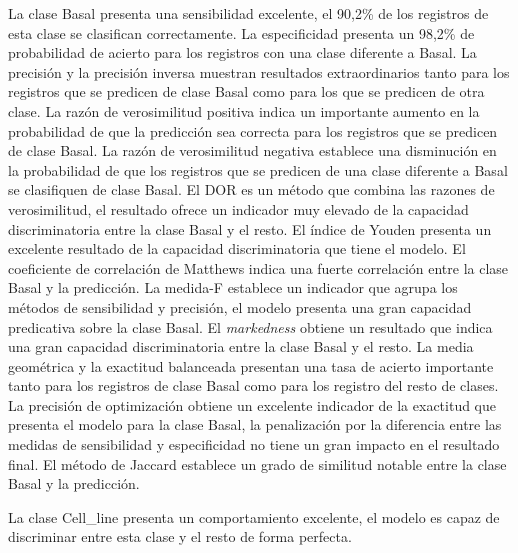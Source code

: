 La clase Basal presenta una sensibilidad excelente, el 90,2\% de los registros de esta clase se clasifican correctamente. La especificidad presenta un 98,2\% de probabilidad de acierto para los registros con una clase diferente a Basal. La precisión y la precisión inversa muestran resultados extraordinarios tanto para los registros que se predicen de clase Basal como para los que se predicen de otra clase. La razón de verosimilitud positiva indica un importante aumento en la probabilidad de que la predicción sea correcta para los registros  que se predicen de clase Basal. La razón de verosimilitud negativa establece una disminución en la probabilidad de que los registros que se predicen de una clase diferente a Basal se clasifiquen de clase Basal. El DOR es un método que combina las razones de verosimilitud, el resultado ofrece un indicador muy elevado de la capacidad discriminatoria entre la clase Basal y el resto. El índice de Youden presenta un excelente resultado de la capacidad discriminatoria que tiene el modelo. El coeficiente de correlación de Matthews indica una fuerte correlación entre la clase Basal y la predicción. La medida-F establece un indicador que agrupa los métodos de sensibilidad y precisión, el modelo presenta una gran capacidad predicativa sobre la clase Basal. El \textit{markedness} obtiene un resultado que indica una gran capacidad discriminatoria entre la clase Basal y el resto. La media geométrica y la exactitud balanceada presentan una tasa de acierto importante tanto para los registros de clase Basal como para los registro del resto de clases. La precisión de optimización obtiene un excelente indicador de la exactitud que presenta el modelo para la clase Basal, la penalización por la diferencia entre las medidas de sensibilidad y especificidad no tiene un gran impacto en el resultado final. El método de Jaccard establece un grado de similitud notable entre la clase Basal y la predicción.

\bigbreak

La clase Cell\_line presenta un comportamiento excelente, el modelo es capaz de discriminar entre esta clase y el resto de forma perfecta.

\bigbreak

